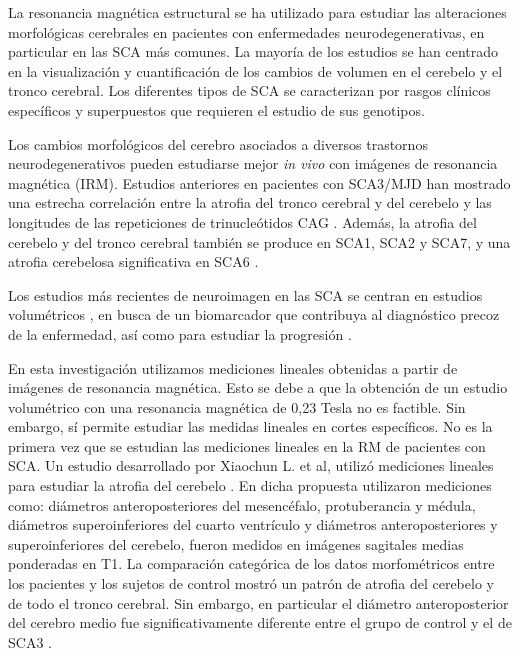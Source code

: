 \documentclass[a4paper,12pt]{article}
\begin{document}
La resonancia magnética estructural se ha utilizado para estudiar las alteraciones morfológicas cerebrales en pacientes con enfermedades neurodegenerativas, en particular en las SCA más comunes. La mayoría de los estudios se han centrado en la visualización y cuantificación de los cambios de volumen en el cerebelo y el tronco cerebral. Los diferentes tipos de SCA se caracterizan por rasgos clínicos específicos y superpuestos que requieren el estudio de sus genotipos. 

Los cambios morfológicos del cerebro asociados a diversos trastornos neurodegenerativos pueden estudiarse mejor {\em in vivo} con imágenes de resonancia magnética (IRM). Estudios anteriores en pacientes con SCA3/MJD han mostrado una estrecha correlación entre la atrofia del tronco cerebral y del cerebelo y las longitudes de las repeticiones de trinucleótidos CAG \cite{donath_neurofilament_2022}. Además, la atrofia del cerebelo y del tronco cerebral también se produce en SCA1, SCA2 y SCA7, y una atrofia cerebelosa significativa en SCA6 \cite{liang_correlation_2009,onodera_progressive_1998}.


Los estudios más recientes de neuroimagen en las SCA se centran en estudios volumétricos \cite{cabeza-ruiz_convolutional_2022}, en busca de un biomarcador que contribuya al diagnóstico precoz de la enfermedad, así como para estudiar la progresión \cite{coarelli_plasma_2021,mascalchi_neuroimaging_2020,straub_toward_2020}. 



En esta investigación utilizamos mediciones lineales obtenidas a partir de imágenes de resonancia magnética. Esto se debe a que la obtención de un estudio volumétrico con una resonancia magnética de 0,23 Tesla no es factible.  Sin embargo, sí permite estudiar las medidas lineales en cortes específicos. No es la primera vez que se estudian las mediciones lineales en la RM de pacientes con SCA.  Un estudio desarrollado por Xiaochun L. et al, utilizó mediciones lineales para estudiar la atrofia del cerebelo \cite{liang_correlation_2009}. En dicha propuesta utilizaron mediciones como: diámetros anteroposteriores del mesencéfalo, protuberancia y médula, diámetros superoinferiores del cuarto ventrículo y diámetros anteroposteriores y superoinferiores del cerebelo, fueron medidos en imágenes sagitales medias ponderadas en T1. La comparación categórica de los datos morfométricos entre los pacientes y los sujetos de control mostró un patrón de atrofia del cerebelo y de todo el tronco cerebral. Sin embargo, en particular el diámetro anteroposterior del cerebro medio fue significativamente diferente entre el grupo de control y el de SCA3 \cite{onodera_progressive_1998,liang_correlation_2009}.
\end{document}
